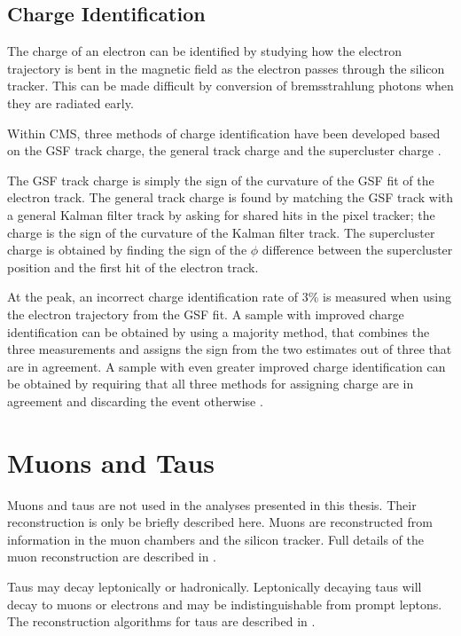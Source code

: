 \subsection{Charge Identification}
\label{sec:charge}
The charge of an electron can be identified by studying how the electron
trajectory is bent in the magnetic field as the electron passes through the
silicon tracker. This can be made difficult by conversion of bremsstrahlung
photons when they are radiated early.

Within CMS, three methods of charge identification have been developed based on
the {GSF} track charge, the general track charge and the supercluster charge
\cite{adam2009electron}. 

The {GSF} track charge is simply the sign of the curvature of the {GSF} fit of
the electron track.  The general track charge is found by matching the {GSF}
track with a general Kalman filter track by asking for shared hits in the pixel
tracker; the charge is the sign of the curvature of the Kalman filter track.
The supercluster charge is obtained by finding the sign of the $\phi$ difference
between the supercluster position and the first hit of the electron track.

At the \PZ peak, an incorrect charge identification rate of \unit{3}{\%}
\cite{adam2009electron} is measured when using the electron trajectory from the
{GSF} fit.  A sample with improved charge identification can be obtained by
using a majority method, that combines the three measurements and assigns the
sign from the two estimates out of three that are in agreement.  A sample with
even greater improved charge identification can be obtained by requiring that
all three methods for assigning charge are in agreement and discarding the event
otherwise \cite{adam2009electron}.

\section{Muons and Taus}
Muons and taus are not used in the analyses presented in
this thesis. Their reconstruction is only be briefly described here.  Muons are
reconstructed from information in the muon chambers and the silicon tracker.
Full details of the muon reconstruction are described in
\cite{collaboration2010muon}.

Taus may decay leptonically or hadronically. Leptonically decaying taus will
decay to muons or electrons and may be indistinguishable from prompt
leptons. The reconstruction algorithms for taus are described in
\cite{collaboration2012tau}.

